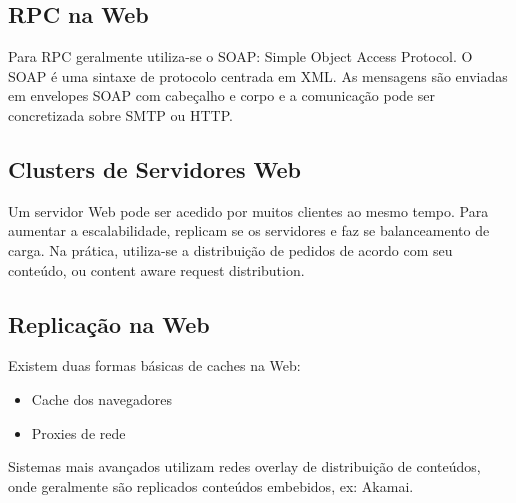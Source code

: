 \documentclass[10pt,a4paper]{report}
\begin{document}
\subsection{RPC na Web}
Para RPC geralmente utiliza-se o SOAP: Simple Object Access Protocol. O SOAP é uma sintaxe de protocolo centrada em XML. As mensagens são enviadas em envelopes SOAP com cabeçalho e corpo e a comunicação pode ser concretizada sobre SMTP ou HTTP.
\subsection{Clusters de Servidores Web}
Um servidor Web pode ser acedido por muitos clientes ao mesmo tempo. Para aumentar a escalabilidade, replicam se os servidores e faz se balanceamento de carga. Na prática, utiliza-se a distribuição de pedidos de acordo com seu conteúdo, ou content aware request distribution.
\subsection{Replicação na Web}
Existem duas formas básicas de caches na Web:
\begin{itemize}
\item Cache dos navegadores
\item Proxies de rede
\end{itemize}
Sistemas mais avançados utilizam redes overlay de distribuição de conteúdos, onde geralmente são replicados conteúdos embebidos, ex: Akamai.
\end{document}
